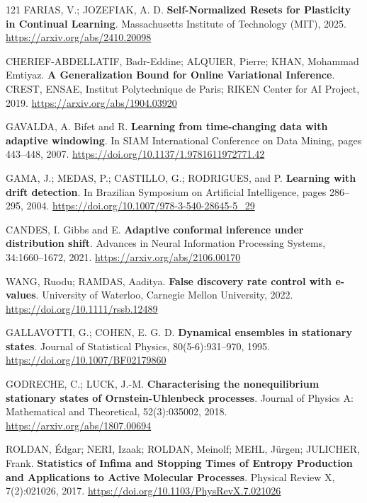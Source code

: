 \begin{thebibliography}{121}
  FARIAS, V.; JOZEFIAK, A. D.
  \newblock \textbf{Self-Normalized Resets for Plasticity in Continual Learning}.
  \newblock Massachusetts Institute of Technology (MIT), 2025.
  \newblock \url{https://arxiv.org/abs/2410.20098}

  CHERIEF-ABDELLATIF, Badr-Eddine; ALQUIER, Pierre; KHAN, Mohammad Emtiyaz.
  \newblock \textbf{A Generalization Bound for Online Variational Inference}.
  \newblock CREST, ENSAE, Institut Polytechnique de Paris; RIKEN Center for AI Project, 2019.
  \newblock \url{https://arxiv.org/abs/1904.03920}

  GAVALDA, A. Bifet and R.
  \newblock \textbf{Learning from time-changing data with adaptive windowing}.
  \newblock In SIAM International Conference on Data Mining, pages 443--448, 2007.
  \newblock \url{https://doi.org/10.1137/1.9781611972771.42}

  GAMA, J.; MEDAS, P.; CASTILLO, G.; RODRIGUES, and P.
  \newblock \textbf{Learning with drift detection}.
  \newblock In Brazilian Symposium on Artificial Intelligence, pages 286--295, 2004.
  \newblock \url{https://doi.org/10.1007/978-3-540-28645-5_29}

  CANDES, I. Gibbs and E.
  \newblock \textbf{Adaptive conformal inference under distribution shift}.
  \newblock Advances in Neural Information Processing Systems, 34:1660--1672, 2021.
  \newblock \url{https://arxiv.org/abs/2106.00170}

  WANG, Ruodu; RAMDAS, Aaditya.
  \newblock \textbf{False discovery rate control with e-values}.
  \newblock University of Waterloo, Carnegie Mellon University, 2022.
  \newblock \url{https://doi.org/10.1111/rssb.12489}

  GALLAVOTTI, G.; COHEN, E. G. D.
  \newblock \textbf{Dynamical ensembles in stationary states}.
  \newblock Journal of Statistical Physics, 80(5-6):931--970, 1995.
  \newblock \url{https://doi.org/10.1007/BF02179860}

  GODRECHE, C.; LUCK, J.-M.
  \newblock \textbf{Characterising the nonequilibrium stationary states of Ornstein-Uhlenbeck processes}.
  \newblock Journal of Physics A: Mathematical and Theoretical, 52(3):035002, 2018.
  \newblock \url{https://arxiv.org/abs/1807.00694}

  ROLDAN, Édgar; NERI, Izaak; ROLDAN, Meinolf; MEHL, Jürgen; JULICHER, Frank.
  \newblock \textbf{Statistics of Infima and Stopping Times of Entropy Production and Applications to Active Molecular Processes}.
  \newblock Physical Review X, 7(2):021026, 2017.
  \newblock \url{https://doi.org/10.1103/PhysRevX.7.021026}


\end{thebibliography}
